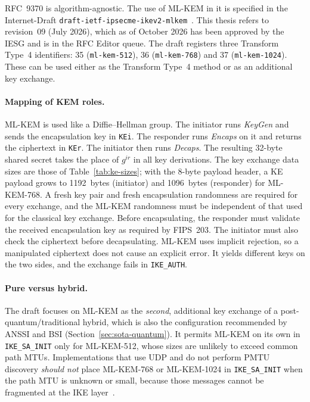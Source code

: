 RFC~9370 is algorithm-agnostic. The use of ML-KEM in it is specified in the
Internet-Draft \texttt{draft-ietf-ipsecme-ikev2-mlkem}~\cite{ikev2mlkem}.
This thesis refers to revision~09 (July 2026), which as of October 2026 has
been approved by the IESG and is in the RFC Editor queue.
The draft registers three Transform Type~4 identifiers: 35
(\texttt{ml-kem-512}), 36 (\texttt{ml-kem-768}) and 37
(\texttt{ml-kem-1024}). These can be used either as the Transform Type~4 method
or as an additional key exchange.

\paragraph{Mapping of KEM roles.}
ML-KEM is used like a Diffie--Hellman group. The initiator runs
\emph{KeyGen} and sends the encapsulation key in \texttt{KEi}. The responder
runs \emph{Encaps} on it and returns the ciphertext in \texttt{KEr}. The
initiator then runs \emph{Decaps}. The resulting 32-byte shared secret takes
the place of $g^{ir}$ in all key derivations. The key exchange data sizes are
those of Table~\ref{tab:ke-sizes}; with the 8-byte payload header, a KE
payload grows to 1192~bytes (initiator) and 1096~bytes (responder) for
ML-KEM-768. A fresh key pair and fresh encapsulation randomness are required
for every exchange, and the ML-KEM randomness must be independent of that used
for the classical key exchange. Before encapsulating, the responder must
validate the received encapsulation key as required by FIPS~203. The initiator
must also check the ciphertext before decapsulating. ML-KEM uses implicit
rejection, so a manipulated ciphertext does not cause an explicit error. It
yields different keys on the two sides, and the exchange fails in
\texttt{IKE\_AUTH}.

\paragraph{Pure versus hybrid.}
The draft focuses on ML-KEM as the \emph{second}, additional key exchange of
a post-quantum/traditional hybrid, which is also the configuration recommended
by ANSSI and BSI (Section~\ref{sec:sota-quantum}). It permits ML-KEM on its
own in \texttt{IKE\_SA\_INIT} only for ML-KEM-512, whose sizes are unlikely to
exceed common path MTUs. Implementations that use UDP and do not perform PMTU
discovery \emph{should not} place ML-KEM-768 or ML-KEM-1024 in
\texttt{IKE\_SA\_INIT} when the path MTU is unknown or small, because those
messages cannot be fragmented at the IKE layer~\cite{ikev2mlkem}.

